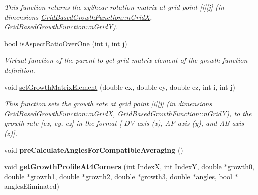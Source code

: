 \begin{DoxyCompactItemize}
\begin{DoxyCompactList}\small\item\em This function returns the xy\+Shear rotation matrix at grid point \mbox{[}i\mbox{]}\mbox{[}j\mbox{]} (in dimensions \hyperlink{classGridBasedGrowthFunction_af872b9963f3a579dcd615c23bcb58a86}{Grid\+Based\+Growth\+Function\+::n\+Grid\+X}, \hyperlink{classGridBasedGrowthFunction_a625bc963a1f1e7d1f1a35dbd0ef51728}{Grid\+Based\+Growth\+Function\+::n\+Grid\+Y}). \end{DoxyCompactList}\item 
\hypertarget{classGridBasedGrowthFunction_ab07937a18f72f31f4875225c1e246032}{}bool \hyperlink{classGridBasedGrowthFunction_ab07937a18f72f31f4875225c1e246032}{is\+Aspect\+Ratio\+Over\+One} (int i, int j)\label{classGridBasedGrowthFunction_ab07937a18f72f31f4875225c1e246032}

\begin{DoxyCompactList}\small\item\em Virtual function of the parent to get grid matrix element of the growth function definition. \end{DoxyCompactList}\item 
\hypertarget{classGridBasedGrowthFunction_a9d01fcbba5732aad966659d4f64c145b}{}void \hyperlink{classGridBasedGrowthFunction_a9d01fcbba5732aad966659d4f64c145b}{set\+Growth\+Matrix\+Element} (double ex, double ey, double ez, int i, int j)\label{classGridBasedGrowthFunction_a9d01fcbba5732aad966659d4f64c145b}

\begin{DoxyCompactList}\small\item\em This function sets the growth rate at grid point \mbox{[}i\mbox{]}\mbox{[}j\mbox{]} (in dimensions \hyperlink{classGridBasedGrowthFunction_af872b9963f3a579dcd615c23bcb58a86}{Grid\+Based\+Growth\+Function\+::n\+Grid\+X}, \hyperlink{classGridBasedGrowthFunction_a625bc963a1f1e7d1f1a35dbd0ef51728}{Grid\+Based\+Growth\+Function\+::n\+Grid\+Y}), to the growth rate \mbox{[}ex, ey, ez\mbox{]} in the format \mbox{[} D\+V axis (x), A\+P axis (y), and A\+B axis (z)\mbox{]}. \end{DoxyCompactList}\item 
\hypertarget{classGridBasedGrowthFunction_a92f4db6ab17ba3539f98895c500ec2d7}{}void {\bfseries pre\+Calculate\+Angles\+For\+Compatible\+Averaging} ()\label{classGridBasedGrowthFunction_a92f4db6ab17ba3539f98895c500ec2d7}

\item 
\hypertarget{classGridBasedGrowthFunction_a11692e47b20e812fe775f99a78480571}{}void {\bfseries get\+Growth\+Profile\+At4\+Corners} (int Index\+X, int Index\+Y, double $\ast$growth0, double $\ast$growth1, double $\ast$growth2, double $\ast$growth3, double $\ast$angles, bool $\ast$angles\+Eliminated)\label{classGridBasedGrowthFunction_a11692e47b20e812fe775f99a78480571}


\end{DoxyCompactItemize}

